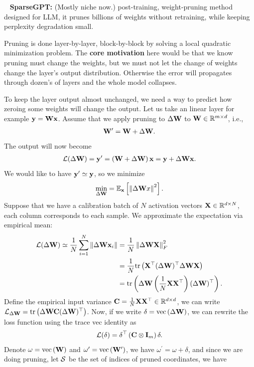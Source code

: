 \documentclass[11pt]{article}  %
\begin{document}
\textbullet~ \textbf{SparseGPT:} (Mostly niche now.) post-training, weight-pruning method designed for LLM, it prunes billions of weights without retraining, while keeping perplexity degradation small.

Pruning is done layer-by-layer, block-by-block by solving a local quadratic minimization problem.
The \textbf{core motivation} here would be that we know pruning must change the weights, but we must not let the change of weights change the layer's output distribution.
Otherwise the error will propagates through dozen's of layers and the whole model collapses.

To keep the layer output almost unchanged, we need a way to predict how zeroing some weights will change the output.
Let us take an linear layer for example $\mathbf{y} = \mathbf{W} \mathbf{x}$.
Assume that we apply pruning to $\Delta \mathbf{W}$ to $\mathbf{W} \in \mathbb{R}^{m \times d}$, i.e., 
\begin{align*}
  \mathbf{W}^\prime = \mathbf{W} + \Delta \mathbf{W}.
\end{align*}
The output will now become 
\begin{align*}
  \mathcal{L}(\Delta \mathbf{W}) = \mathbf{y}^\prime = \left( \mathbf{W} + \Delta \mathbf{W} \right)\mathbf{x} = \mathbf{y} + \Delta \mathbf{W} \mathbf{x}.
\end{align*}
We would like to have $\mathbf{y}^\prime \simeq \mathbf{y}$, so we minimize 
\begin{align*}
  \min_{\Delta \mathbf{W}} = \mathbb{E}_{\mathbf{x}}\left[\left\lVert \Delta \mathbf{W} x \right\rVert^2\right].
\end{align*}
Suppose that we have a calibration batch of $N$ activation vectors $\mathbf{X} \in \mathbb{R}^{d \times N}$, each column corresponds to each sample.
We approximate the expectation via empirical mean:
\begin{align*}
  \mathcal{L}(\Delta \mathbf{W}) \simeq \frac{1}{N}\sum_{i=1}^{N} \left\lVert \Delta \mathbf{W} \mathbf{x}_i \right\rVert &= \frac{1}{N}\left\lVert \Delta \mathbf{W} \mathbf{X} \right\rVert^2_{F} \\
  &= \frac{1}{N}\mathrm{tr}\left(\mathbf{X}^{\top} (\Delta\mathbf{W})^{\top} \Delta \mathbf{W} \mathbf{X}\right) \\
  &= \mathrm{tr}\left(\Delta \mathbf{W} \left( \frac{1}{N}\mathbf{X}\mathbf{X}^{\top} \right)(\Delta \mathbf{W})^{\top}\right).
\end{align*}
Define the empirical input variance $\mathbf{C} = \frac{1}{N}\mathbf{X}\mathbf{X}^{\top} \in \mathbb{R}^{d \times d}$, we can write $\mathcal{L}_{\Delta\mathbf{W}} = \mathrm{tr}\left(\Delta \mathbf{W} \mathbf{C} (\Delta \mathbf{W})^{\top}\right)$.
Now, if we write $\delta = \text{vec}\left( \Delta \mathbf{W} \right)$, we can rewrite the loss function using the trace vec identity as
\begin{align*}
  \mathcal{L}(\delta) = \delta^{\top}\left( \mathbf{C} \otimes \mathbf{I}_m \right) \delta.
\end{align*}
Denote $\omega = \text{vec}\left( \mathbf{W} \right)$ and $\omega^\prime = \text{vec}\left( \mathbf{W}^\prime \right)$, we have $\omega^\prime = \omega + \delta$, and since we are doing pruning, let $\mathcal{S}$ be the set of indices of pruned coordinates, we have 
\end{document}
